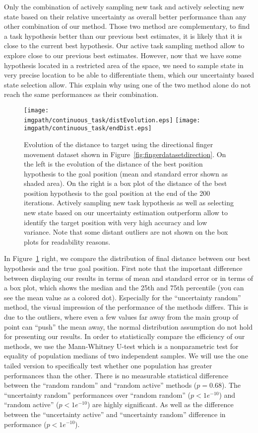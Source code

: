 Only the combination of actively sampling new task and actively selecting new state based on their relative uncertainty as overall better performance than any other combination of our method. Those two method are complementary, to find a task hypothesis better than our previous best estimates, it is likely that it is close to the current best hypothesis. Our active task sampling method allow to explore close to our previous best estimates. However, now that we have some hypothesis located in a restricted area of the space, we need to sample state in very precise location to be able to differentiate them, which our uncertainty based state selection allow. This explain why using one of the two method alone do not reach the same performances as their combination.

\begin{figure}[!htbp]
\centering
\texttt{[image: \\imgpath/continuous\_task/distEvolution.eps]}
\texttt{[image: \\imgpath/continuous\_task/endDist.eps]}
\caption{Evolution of the distance to target using the directional finger movement dataset shown in Figure~\ref{fig:fingerdatasetdirection}. On the left is the evolution of the distance of the best position hypothesis to the goal position (mean and standard error shown as shaded area). On the right is a box plot of the distance of the best position hypothesis to the goal position at the end of the 200 iterations. Actively sampling new task hypothesis as well as selecting new state based on our uncertainty estimation outperform allow to identify the target position with very high accuracy and low variance. Note that some distant outliers are not shown on the box plots for readability reasons.}
\label{fig:continuoustaskdistevolution}
\end{figure}

In Figure~\ref{fig:continuoustaskdistevolution} right, we compare the distribution of final distance between our best hypothesis and the true goal position. First note that the important difference between displaying our results in terms of mean and standard error or in terms of a box plot, which shows the median and the 25th and 75th percentile (you can see the mean value as a colored dot). Especially for the ``uncertainty random'' method, the visual impression of the performance of the methods differs. This is due to the outliers, where even a few values far away from the main group of point can ``push'' the mean away, the normal distribution assumption do not hold for presenting our results. In order to statistically compare the efficiency of our methods, we use the Mann-Whitney U-test \cite{mann1947test} which is a nonparametric test for equality of population medians of two independent samples. We will use the one tailed version to specifically test whether one population has greater performances than the other. There is no measurable statistical difference between the ``random random'' and ``random active'' methods ($p = 0.68$). The ``uncertainty random'' performances over ``random random'' ($p<1e^{-10}$) and ``random active'' ($p<1e^{-10}$) are highly significant. As well as the difference between the ``uncertainty active'' and ``uncertainty random'' difference in performance ($p<1e^{-10}$).

